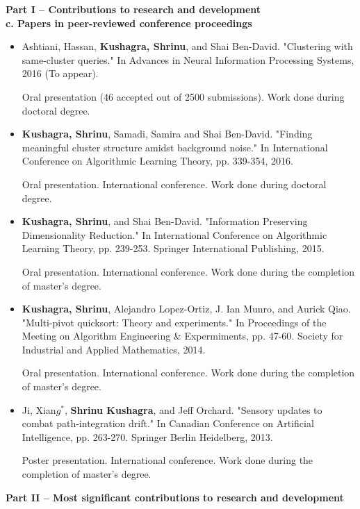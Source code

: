 \documentclass[12pt]{article}
\begin{document}
\linespread{0.901}

\noindent\textbf{Part I – Contributions to research and development}\\
\textbf{c. Papers in peer-reviewed conference proceedings }

\begin{itemize}[noitemsep]
\item   Ashtiani, Hassan, \textbf{Kushagra, Shrinu}, and Shai Ben-David. "Clustering with same-cluster queries." In Advances in Neural Information Processing Systems, 2016 (To appear).

Oral presentation (46 accepted out of 2500 submissions). Work done during doctoral degree.

\item  \textbf{Kushagra, Shrinu}, Samadi, Samira and Shai Ben-David. "Finding meaningful cluster structure amidst background noise." In International Conference on Algorithmic Learning Theory, pp. 339-354, 2016.

Oral presentation. International conference. Work done during doctoral degree.
 
\item \textbf{Kushagra, Shrinu}, and Shai Ben-David. "Information Preserving Dimensionality Reduction." In International Conference on Algorithmic Learning Theory, pp. 239-253. Springer International Publishing, 2015.

Oral presentation. International conference. Work done during the completion of master's degree.

\item \textbf{Kushagra, Shrinu}, Alejandro Lopez-Ortiz, J. Ian Munro, and Aurick Qiao. "Multi-pivot quicksort: Theory and experiments." In Proceedings of the Meeting on Algorithm Engineering \& Expermiments, pp. 47-60. Society for Industrial and Applied Mathematics, 2014.

Oral presentation. International conference. Work done during the completion of master's degree.

\item Ji, Xian$g^*$, \textbf{Shrinu Kushagra}, and Jeff Orchard. "Sensory updates to combat path-integration drift." In Canadian Conference on Artificial Intelligence, pp. 263-270. Springer Berlin Heidelberg, 2013.

Poster presentation. International conference. Work done during the completion of master's degree.
\end{itemize}

\noindent\textbf{Part II – Most significant contributions to research and development}
\end{document}
